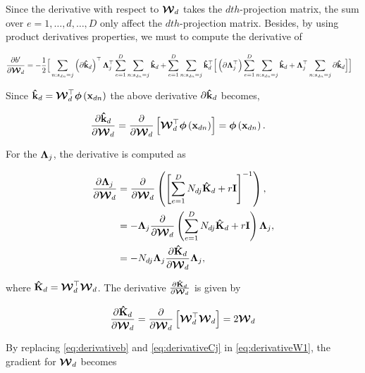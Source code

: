 	Since the derivative with respect to $\boldsymbol{\mathcal{W}}_d$ takes the $dth$-projection matrix, the sum over $e = 1, \dots, d, \dots, D$ only affect the $dth$-projection matrix. Besides, by using product derivatives properties, we must to compute the derivative of 
	
	\begin{align}
	\frac{\partial b'}{\dWj} &=  -\frac{1}{2}\Big[\sum\limits_{n:s_{dn}=j}  \left(\partial \kawx\right)^\top\C^\top \sum\limits_{e=1}^{D}\sum\limits_{n:s_{dn}=j}\kawx + \sum\limits_{e=1}^{D}\sum\limits_{n:s_{dn}=j}\kawx^\top \Big[\left(\partial \C^\top\right) \sum\limits_{e=1}^{D}\sum\limits_{n:s_{dn}=j} \kawx +\C^\top \sum\limits_{n:s_{dn}=j} \partial\kawx\Big]
	\Big]
	\label{eq:derivativeb}
	\end{align}
	
	Since $\mathbf{\hat{k}}_d = \boldsymbol{\mathcal{W}}_d^\top\boldsymbol{\phi}\left(\mathbf{x}_{dn}\right)$ the above derivative $\partial \mathbf{\hat{k}}_d$ becomes,
	
	\begin{align}
	\frac{\partial \mathbf{\hat{k}}_d}{\partial\boldsymbol{\mathcal{W}}_d} &= \frac{\partial }{\partial\boldsymbol{\mathcal{W}}_d}\left[\boldsymbol{\mathcal{W}}_d^\top\boldsymbol{\phi}\left(\mathbf{x}_{dn}\right)\right]= \boldsymbol{\phi}\left(\mathbf{x}_{dn}\right).
	\end{align}
	
	For the $\boldsymbol{\Lambda}_j$, the derivative is computed as
	
	\begin{align}
	\frac{\partial \C}{\dWj} &= \frac{\partial}{\dWj}\left( \left[\sum_{e=1}^{D}N_{dj}\mathbf{\hat{K}}_d + r\eye\right]^{-1}\right),\notag \\
	&= -\C\frac{\partial}{\dWj}\left( \sum_{e=1}^{D}N_{dj}\mathbf{\hat{K}}_d + r\eye\right) \C,\notag \\
	&= -N_{dj}\C\frac{ \partial \mathbf{\hat{K}}_d}{\dWj} \C,
	\label{eq:derivativeCj}
	\end{align}
	
	where $\mathbf{\hat{K}}_d  = \boldsymbol{\mathcal{W}}_d^\top\boldsymbol{\mathcal{W}}_d$. The derivative $\frac{\partial \mathbf{\hat{K}}_d}{\partial\boldsymbol{\mathcal{W}}_d}$ is given by
	
	\begin{align}
	\frac{\partial \mathbf{\hat{K}}_d}{\partial\boldsymbol{\mathcal{W}}_d} = \frac{\partial}{\partial\boldsymbol{\mathcal{W}}_d}\left[\boldsymbol{\mathcal{W}}_d^\top\boldsymbol{\mathcal{W}}_d\right] = 2\boldsymbol{\mathcal{W}}_d
	\end{align}
	
	
	By replacing \eqref{eq:derivativeb} and \eqref{eq:derivativeCj} in \eqref{eq:derivativeW1}, the gradient for $\boldsymbol{\mathcal{W}}_d$ becomes
	
